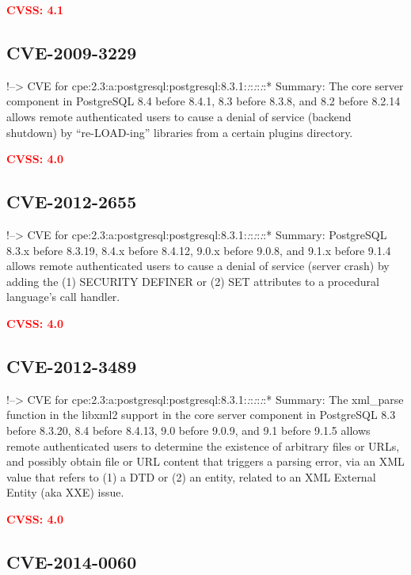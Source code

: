 \documentclass[a4paper, 12pt]{article}
\begin{document}
\textbf{\textcolor{red}{CVSS: 4.1}}

\hypertarget{cve-2009-3229}{%
\subsection{CVE-2009-3229}\label{cve-2009-3229}}

!--\textgreater{} CVE for
cpe:2.3:a:postgresql:postgresql:8.3.1:\emph{:}:\emph{:}:\emph{:}:*
Summary: The core server component in PostgreSQL 8.4 before 8.4.1, 8.3
before 8.3.8, and 8.2 before 8.2.14 allows remote authenticated users to
cause a denial of service (backend shutdown) by ``re-LOAD-ing''
libraries from a certain plugins directory.

\textbf{\textcolor{red}{CVSS: 4.0}}

\hypertarget{cve-2012-2655}{%
\subsection{CVE-2012-2655}\label{cve-2012-2655}}

!--\textgreater{} CVE for
cpe:2.3:a:postgresql:postgresql:8.3.1:\emph{:}:\emph{:}:\emph{:}:*
Summary: PostgreSQL 8.3.x before 8.3.19, 8.4.x before 8.4.12, 9.0.x
before 9.0.8, and 9.1.x before 9.1.4 allows remote authenticated users
to cause a denial of service (server crash) by adding the (1) SECURITY
DEFINER or (2) SET attributes to a procedural language's call handler.

\textbf{\textcolor{red}{CVSS: 4.0}}

\hypertarget{cve-2012-3489}{%
\subsection{CVE-2012-3489}\label{cve-2012-3489}}

!--\textgreater{} CVE for
cpe:2.3:a:postgresql:postgresql:8.3.1:\emph{:}:\emph{:}:\emph{:}:*
Summary: The xml\_parse function in the libxml2 support in the core
server component in PostgreSQL 8.3 before 8.3.20, 8.4 before 8.4.13, 9.0
before 9.0.9, and 9.1 before 9.1.5 allows remote authenticated users to
determine the existence of arbitrary files or URLs, and possibly obtain
file or URL content that triggers a parsing error, via an XML value that
refers to (1) a DTD or (2) an entity, related to an XML External Entity
(aka XXE) issue.

\textbf{\textcolor{red}{CVSS: 4.0}}

\hypertarget{cve-2014-0060}{%
\subsection{CVE-2014-0060}\label{cve-2014-0060}}
\end{document}
